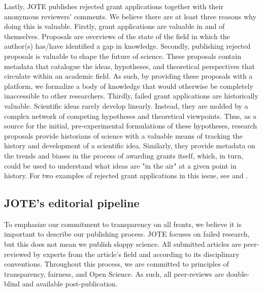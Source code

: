 \documentclass[twocolumn, serif, editorial, authordate]{jote-article}
\begin{document}
Lastly, JOTE publishes rejected grant applications together with their anonymous reviewers' comments. We believe there are at least three reasons why doing this is valuable. Firstly, grant applications are valuable in and of themselves. Proposals are overviews of the state of the field in which the author(s) has/have identified a gap in knowledge. Secondly, publishing rejected proposals is valuable to shape the future of science. These proposals contain metadata that catalogue the ideas, hypotheses, and theoretical perspectives that circulate within an academic field. As such, by providing these proposals with a platform, we formalize a body of knowledge that would otherwise be completely inaccessible to other researchers. Thirdly, failed grant applications are historically valuable. Scientific ideas rarely develop linearly. Instead, they are molded by a complex network of competing hypotheses and theoretical viewpoints. Thus, as a source for the initial, pre-experimental formulations of these hypotheses, research proposals provide historians of science with a valuable means of tracking the history and development of a scientific idea. Similarly, they provide metadata on the trends and biases in the process of awarding grants itself, which, in turn, could be used to understand what ideas are "in the air" at a given point in history. For two examples of rejected grant applications in this issue, see \textcite{Bekkers2020} and \textcite{Cheplygina2020}.

 {}\subsection*{JOTE's editorial pipeline}

To emphasize our commitment to transparency on all fronts, we believe it is important to describe our publishing process. JOTE focuses on failed research, but this does not mean we publish sloppy science. All submitted articles are peer-reviewed by experts from the article's field and according to its disciplinary conventions. Throughout this process, we are committed to principles of transparency, fairness, and Open Science. As such, all peer-reviews are double-blind and available post-publication.
\end{document}
